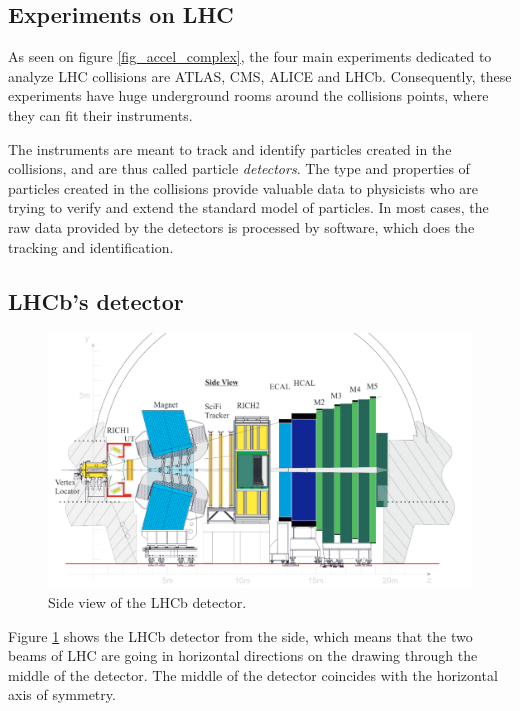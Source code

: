 \documentclass[12pt]{article}
\begin{document}
	
	\subsection{Experiments on LHC}
	
	As seen on figure \ref{fig_accel_complex}, the four main experiments dedicated to analyze LHC collisions are ATLAS, CMS, ALICE and LHCb. Consequently, these experiments have huge underground rooms around the collisions points, where they can fit their instruments.
	
	The instruments are meant to track and identify particles created in the collisions, and are thus called particle \textit{detectors}. The type and properties of particles created in the collisions provide valuable data to physicists who are trying to verify and extend the standard model of particles. In most cases, the raw data provided by the detectors is processed by software, which does the tracking and identification.
	
	
	\subsection{LHCb's detector}
		
	\begin{figure}[H]
		\includegraphics[width=\textwidth]{lhcb_geometry_upgrade}
		\caption{Side view of the LHCb detector.}
		\label{fig_lhcb_geometry}
	\end{figure}

	Figure \ref{fig_lhcb_geometry} shows the LHCb detector from the side, which means that the two beams of LHC are going in horizontal directions on the drawing through the middle of the detector. The middle of the detector coincides with the horizontal axis of symmetry.
	
\end{document}
